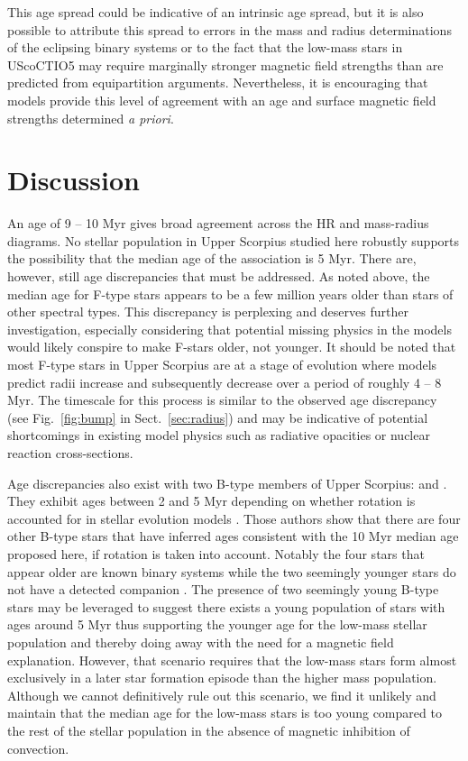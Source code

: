 \documentclass{aa}
\begin{document}
This age spread could be indicative of an intrinsic age spread, but it is also possible to attribute this spread to errors in the mass and radius determinations of the eclipsing binary systems or to the fact that the low-mass stars in UScoCTIO5 may require marginally stronger magnetic field strengths than are predicted from equipartition arguments. Nevertheless, it is encouraging that models provide this level of agreement with an age and surface magnetic field strengths determined \emph{a priori}. 

\section{Discussion}
\label{sec:disc}
An age of 9 -- 10 Myr gives broad agreement across the HR and mass-radius diagrams. No stellar population in Upper Scorpius studied here robustly supports the possibility that the median age of the association is 5 Myr. There are, however, still age discrepancies that must be addressed. As noted above, the median age for F-type stars appears to be a few million years older than stars of other spectral types. This discrepancy is perplexing and deserves further investigation, especially considering that potential missing physics in the models would likely conspire to make F-stars older, not younger. It should be noted that most F-type stars in Upper Scorpius are at a stage of evolution where models predict radii increase and subsequently decrease over a period of roughly 4 -- 8 Myr. The timescale for this process is similar to the observed age discrepancy (see Fig.~\ref{fig:bump} in Sect.~\ref{sec:radius}) and may be indicative of potential shortcomings in existing model physics such as radiative opacities or nuclear reaction cross-sections. 

Age discrepancies also exist with two B-type members of Upper Scorpius:  and . They exhibit ages between 2 and 5 Myr depending on whether rotation is accounted for in stellar evolution models \citep{Pecaut2012}. Those authors show that there are four other B-type stars that have inferred ages consistent with the 10 Myr median age proposed here, if rotation is taken into account. Notably the four stars that appear older are known binary systems while the two seemingly younger stars do not have a detected companion \citep{Pecaut2012}. The presence of two seemingly young B-type stars may be leveraged to suggest there exists a young population of stars with ages around 5 Myr thus supporting the younger age for the low-mass stellar population and thereby doing away with the need for a magnetic field explanation. However, that scenario requires that the low-mass stars form almost exclusively in a later star formation episode than the higher mass population. Although we cannot definitively rule out this scenario, we find it unlikely and maintain that the median age for the low-mass stars is too young compared to the rest of the stellar population in the absence of magnetic inhibition of convection.
\end{document}
